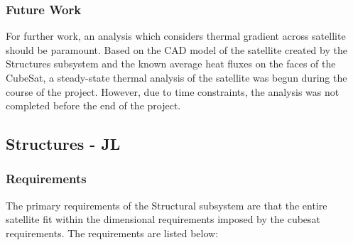 \documentclass[12pt]{article}
\begin{document}
\subsubsection{Future Work}

For further work, an analysis which considers thermal gradient across satellite should be paramount. Based on the CAD model of the satellite created by the Structures subsystem and the known average heat fluxes on the faces of the CubeSat, a steady-state thermal analysis of the satellite was begun during the course of the project. However, due to time constraints, the analysis was not completed before the end of the project.

\newpage
\FloatBarrier

\subsection{Structures - JL}

\subsubsection{Requirements}

The primary requirements of the Structural subsystem are that the entire satellite fit within the dimensional requirements imposed by the cubesat requirements. The requirements are listed below:
\end{document}
